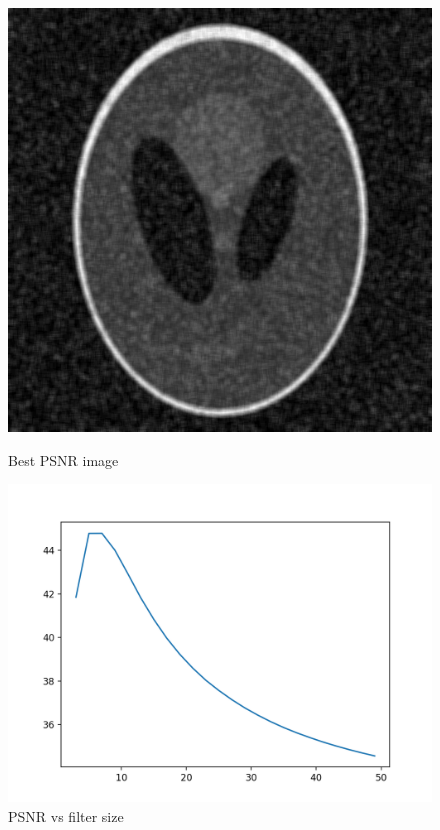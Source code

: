 \documentclass{article}
\begin{document}
    \begin{figure}[!htb]
      \includegraphics[scale=0.3]{./basic_denoising/shepplogan/average_best_sp.png}
      \caption{Best PSNR image}
    \endminipage \hfill
      \includegraphics[scale=.45]{./basic_denoising/shepplogan/average_psnr_sp.png}
      \caption{PSNR vs filter size}
    \endminipage
    \end{figure}
    
\end{document}
